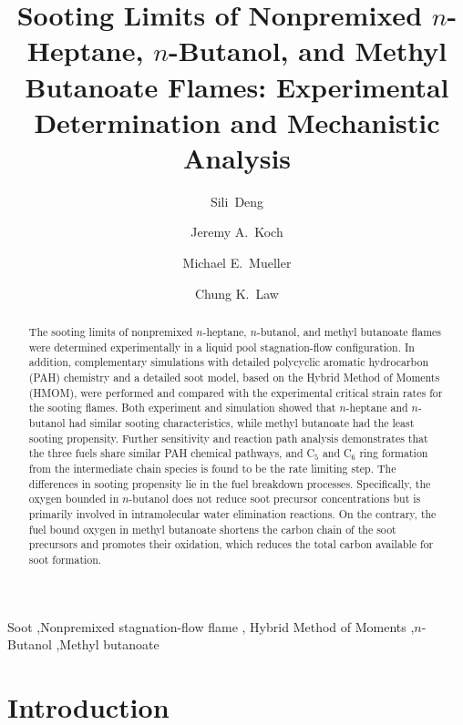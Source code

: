 \documentclass[review,3p,times]{elsarticleUS}
\begin{document}
\begin{frontmatter}

\title{Sooting Limits of Nonpremixed $n$-Heptane, $n$-Butanol, and Methyl Butanoate Flames: Experimental Determination and Mechanistic Analysis}

\author{Sili~Deng}
\author{Jeremy A.~Koch}
\author{Michael E.~Mueller}
\author{Chung K.~Law}

\address{Department of Mechanical and Aerospace Engineering, Princeton University, Princeton, NJ 08544, USA}


\begin{abstract}
The sooting limits of nonpremixed $n$-heptane, $n$-butanol, and methyl butanoate flames were determined experimentally in a liquid pool stagnation-flow configuration.  In addition, complementary simulations with detailed polycyclic aromatic hydrocarbon (PAH) chemistry and a detailed soot model, based on the Hybrid Method of Moments (HMOM), were performed and compared with the experimental critical strain rates for the sooting flames.  Both experiment and simulation showed that $n$-heptane and $n$-butanol had similar sooting characteristics, while methyl butanoate had the least sooting propensity.  Further sensitivity and reaction path analysis demonstrates that the three fuels share similar PAH chemical pathways, and C$_5$ and C$_6$ ring formation from the intermediate chain species is found to be the rate limiting step.  The differences in sooting propensity lie in the fuel breakdown processes.  Specifically, the oxygen bounded in $n$-butanol does not reduce soot precursor concentrations but is primarily involved in intramolecular water elimination reactions. On the contrary, the fuel bound oxygen in methyl butanoate shortens the carbon chain of the soot precursors and promotes their oxidation, which reduces the total carbon available for soot formation. 
\end{abstract}

\begin{keyword} 
Soot \sep Nonpremixed stagnation-flow flame \sep
Hybrid Method of Moments \sep $n$-Butanol \sep Methyl butanoate
\end{keyword}

\end{frontmatter}

\section{Introduction}
\end{document}
